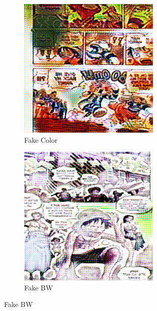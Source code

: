 \begin{figure}
\centering
    \begin{subfigure}[b]{0.3\textwidth}
        \includegraphics[width=\textwidth]{chapter/output/epoch100_fake_B.png}
        \caption{Fake Color}
    \end{subfigure}
    \hfill
    \begin{subfigure}[b]{0.3\textwidth}
        \includegraphics[width=\textwidth]{chapter/output/epoch100_fake_A.png}
        \caption{Fake BW}
    \end{subfigure}

\end{figure}

